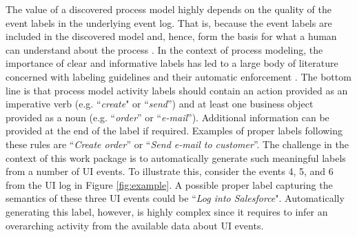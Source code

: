 The value of a discovered process model highly depends on the quality of the event labels in the underlying event log. That is, because the event labels are included in the discovered model and, hence, form the basis for what a human can understand about the process \cite{mendling2010activity,Leopold2013Book}. In the context of process modeling, the importance of clear and informative labels has led to a large body of literature concerned with labeling guidelines \cite{mendling2010seven,leopold2015learning} and their automatic enforcement \cite{leopold2013detection,becker2009towards}. The bottom line is that process model activity labels should contain an action provided as an imperative verb (e.g. ``\textit{create}" or ``\textit{send}'') and at least one business object provided as a noun (e.g. ``\textit{order}'' or ``\textit{e-mail}''). Additional information can be provided at the end of the label if required. Examples of proper labels following these rules are ``\textit{Create order}'' or ``\textit{Send e-mail to customer}''. The challenge in the context of this work package is to automatically generate such meaningful labels from a number of UI events. To illustrate this, consider the events 4, 5, and 6 from the UI log in Figure \ref{fig:example}. A possible proper label capturing the semantics of these three UI events could be ``\textit{Log into Salesforce}". Automatically generating this label, however, is highly complex since it requires to infer an overarching activity from the available data about UI events.


